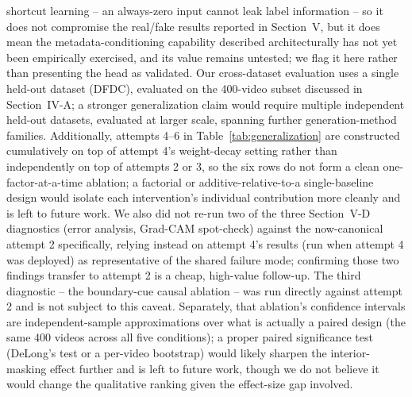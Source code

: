 \documentclass[conference]{IEEEtran}
\begin{document}
shortcut learning -- an always-zero input cannot leak label information --
so it does not compromise the real/fake results reported in Section~V, but
it does mean the metadata-conditioning capability described
architecturally has not yet been empirically exercised, and its value
remains untested; we flag it here rather than presenting the head as
validated. Our cross-dataset evaluation uses a single held-out dataset
(DFDC), evaluated on the 400-video subset discussed in Section~IV-A; a
stronger generalization claim would require multiple independent held-out
datasets, evaluated at larger scale, spanning further generation-method
families. Additionally, attempts 4--6 in Table~\ref{tab:generalization} are
constructed cumulatively on top of attempt 4's weight-decay setting rather
than independently on top of attempts 2 or 3, so the six rows do not form a
clean one-factor-at-a-time ablation; a factorial or additive-relative-to-a
single-baseline design would isolate each intervention's individual
contribution more cleanly and is left to future work. We also did not
re-run two of the three Section~V-D diagnostics (error analysis, Grad-CAM
spot-check) against the now-canonical attempt 2 specifically, relying
instead on attempt 4's results (run when attempt 4 was deployed) as
representative of the shared failure mode; confirming those two findings
transfer to attempt 2 is a cheap, high-value follow-up. The third
diagnostic -- the boundary-cue causal ablation -- was run directly against
attempt 2 and is not subject to this caveat. Separately, that ablation's
confidence intervals are independent-sample approximations over what is
actually a paired design (the same 400 videos across all five conditions);
a proper paired significance test (DeLong's test or a per-video bootstrap)
would likely sharpen the interior-masking effect further and is left to
future work, though we do not believe it would change the qualitative
ranking given the effect-size gap involved.
\end{document}
